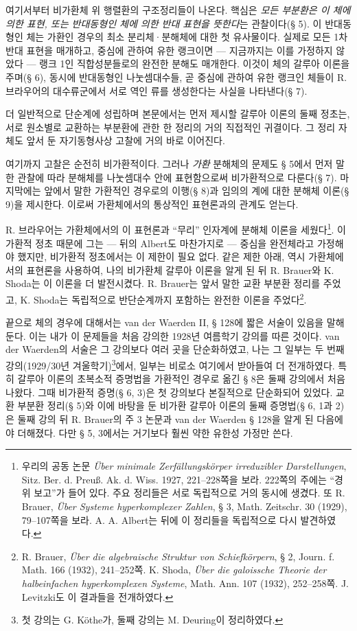 여기서부터 비가환체 위 행렬환의 구조정리들이 나온다. 핵심은 \emph{모든 부분환은 이 체에 의한 표현, 또는 반대동형인 체에 의한 반대 표현을 뜻한다}는 관찰이다(§ 5). 이 반대동형인 체는 가환인 경우의 최소 분리체·분해체에 대한 첫 유사물이다. 실제로 모든 1차 반대 표현을 매개하고, 중심에 관하여 유한 랭크이면 --- 지금까지는 이를 가정하지 않았다 --- 랭크 1인 직합성분들로의 완전한 분해도 매개한다. 이것이 체의 갈루아 이론을 주며(§ 6), 동시에 반대동형인 나눗셈대수들, 곧 중심에 관하여 유한 랭크인 체들이 R. 브라우어의 대수류군에서 서로 역인 류를 생성한다는 사실을 나타낸다(§ 7).

더 일반적으로 단순계에 성립하며 본문에서는 먼저 제시할 갈루아 이론의 둘째 정초는, 서로 원소별로 교환하는 부분환에 관한 한 정리의 거의 직접적인 귀결이다. 그 정리 자체도 앞서 둔 자기동형사상 고찰에 거의 바로 이어진다.

여기까지 고찰은 순전히 비가환적이다. 그러나 \emph{가환} 분해체의 문제도 § 5에서 먼저 말한 관찰에 따라 분해체를 나눗셈대수 안에 표현함으로써 비가환적으로 다룬다(§ 7). 마지막에는 앞에서 말한 가환적인 경우로의 이행(§ 8)과 임의의 계에 대한 분해체 이론(§ 9)을 제시한다. 이로써 가환체에서의 통상적인 표현론과의 관계도 얻는다.

R. 브라우어는 가환체에서의 이 표현론과 “무리” 인자계에 분해체 이론을 세웠다\footnote{우리의 공동 논문 \emph{Über minimale Zerfällungskörper irreduzibler Darstellungen}, Sitz. Ber. d. Preuß. Ak. d. Wiss. 1927, 221--228쪽을 보라. 222쪽의 주에는 “경위 보고”가 들어 있다. 주요 정리들은 서로 독립적으로 거의 동시에 생겼다. 또 R. Brauer, \emph{Über Systeme hyperkomplexer Zahlen}, § 3, Math. Zeitschr. 30 (1929), 79--107쪽을 보라. A. A. Albert는 뒤에 이 정리들을 독립적으로 다시 발견하였다.}. 이 가환적 정초 때문에 그는 --- 뒤의 Albert도 마찬가지로 --- 중심을 완전체라고 가정해야 했지만, 비가환적 정초에서는 이 제한이 필요 없다. 같은 제한 아래, 역시 가환체에서의 표현론을 사용하여, 나의 비가환체 갈루아 이론을 알게 된 뒤 R. Brauer와 K. Shoda는 이 이론을 더 발전시켰다. R. Brauer는 앞서 말한 교환 부분환 정리를 주었고, K. Shoda는 독립적으로 반단순계까지 포함하는 완전한 이론을 주었다\footnote{R. Brauer, \emph{Über die algebraische Struktur von Schiefkörpern}, § 2, Journ. f. Math. 166 (1932), 241--252쪽. K. Shoda, \emph{Über die galoissche Theorie der halbeinfachen hyperkomplexen Systeme}, Math. Ann. 107 (1932), 252--258쪽. J. Levitzki도 이 결과들을 전개하였다.}.

끝으로 체의 경우에 대해서는 van der Waerden II, § 128에 짧은 서술이 있음을 말해 둔다. 이는 내가 이 문제들을 처음 강의한 1928년 여름학기 강의를 따른 것이다. van der Waerden의 서술은 그 강의보다 여러 곳을 단순화하였고, 나는 그 일부는 두 번째 강의(1929/30년 겨울학기)\footnote{첫 강의는 G. Köthe가, 둘째 강의는 M. Deuring이 정리하였다.}에서, 일부는 비로소 여기에서 받아들여 더 전개하였다. 특히 갈루아 이론의 초복소적 증명법을 가환적인 경우로 옮긴 § 8은 둘째 강의에서 처음 나왔다. 그때 비가환적 증명(§ 6, 3)은 첫 강의보다 본질적으로 단순화되어 있었다. 교환 부분환 정리(§ 5)와 이에 바탕을 둔 비가환 갈루아 이론의 둘째 증명법(§ 6, 1과 2)은 둘째 강의 뒤 R. Brauer의 주 3 논문과 van der Waerden § 128을 알게 된 다음에야 더해졌다. 다만 § 5, 3에서는 거기보다 훨씬 약한 유한성 가정만 쓴다.

